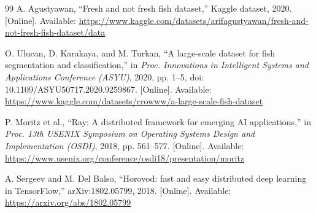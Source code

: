 \documentclass[conference]{IEEEtran}
\begin{document}
\begin{thebibliography}{99}
A. Agustyawan, ``Fresh and not fresh fish dataset,'' Kaggle dataset, 2020. [Online]. Available: \url{https://www.kaggle.com/datasets/arifagustyawan/fresh-and-not-fresh-fish-dataset/data}

O. Ulucan, D. Karakaya, and M. Turkan, ``A large-scale dataset for fish segmentation and classification,'' in \emph{Proc. Innovations in Intelligent Systems and Applications Conference (ASYU)}, 2020, pp. 1--5, doi: 10.1109/ASYU50717.2020.9259867. [Online]. Available: \url{https://www.kaggle.com/datasets/crowww/a-large-scale-fish-dataset}

P. Moritz et al., ``Ray: A distributed framework for emerging AI applications,'' in \emph{Proc. 13th USENIX Symposium on Operating Systems Design and Implementation (OSDI)}, 2018, pp. 561--577. [Online]. Available: \url{https://www.usenix.org/conference/osdi18/presentation/moritz}

A. Sergeev and M. Del Balso, ``Horovod: fast and easy distributed deep learning in TensorFlow,'' arXiv:1802.05799, 2018. [Online]. Available: \url{https://arxiv.org/abs/1802.05799}

\end{thebibliography}
\end{document}
